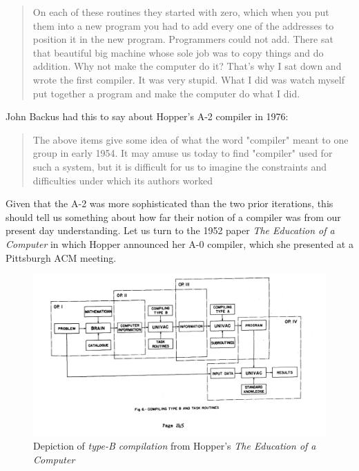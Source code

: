\begin{quotation}
  On each of these routines they started with zero, which when you put them into
  a new program you had to add every one of the addresses to position it in the
  new program. Programmers could not add.  There sat that beautiful big machine
  whose sole job was to copy things and do addition. Why not make the
  computer do
  it? That's why I sat down and wrote the first compiler. It was very stupid.
  What I did was watch myself put together a program and make the computer do
  what I did.
  \cite{Hopper_1980_Oral_History}
\end{quotation}

John Backus had this to say about Hopper's A-2 compiler in 1976:
\begin{quotation}
  The above items give some idea of what the word "compiler" meant to one
  group in early 1954. It may amuse us today to find "compiler" used for such
  a system, but it is difficult for us to imagine the constraints and
  difficulties
  under which its authors worked
  \cite{Backus_1980_Programming_in_America_in_1950s}
\end{quotation}

Given that the A-2 was more sophisticated than the two prior iterations, this
should tell us something about how far their notion of a compiler was from our
present day understanding. Let us turn to the 1952 paper \textit{The Education
of a Computer} in which Hopper announced her A-0 compiler, which she presented
at a Pittsburgh ACM meeting\cite{education_of_a_computer_1952_hopper}.

\begin{figure}[h]
  \centering
  \includegraphics[width=.7\textwidth]{resource/gh_education_of_a_computer_type_fig_6.png}
  \caption{Depiction of \textit{type-B compilation} from Hopper's
  \textit{The Education of a Computer}}
  \label{fig:education-of-a-computer-1952-hopper-f6}
\end{figure}

